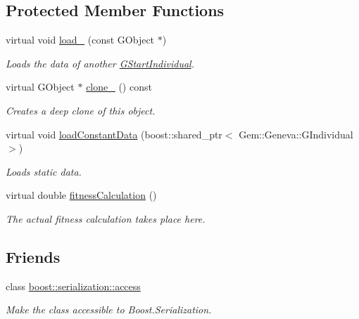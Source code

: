 \subsection*{Protected Member Functions}
\begin{DoxyCompactItemize}
\item 
virtual void \hyperlink{class_gem_1_1_geneva_1_1_g_start_individual_a012447d3b9772d94b8d4d35fb4fc2304}{load\-\_\-} (const G\-Object $\ast$)
\begin{DoxyCompactList}\small\item\em Loads the data of another \hyperlink{class_gem_1_1_geneva_1_1_g_start_individual}{G\-Start\-Individual}. \end{DoxyCompactList}\item 
virtual G\-Object $\ast$ \hyperlink{class_gem_1_1_geneva_1_1_g_start_individual_aa7d75cb7a4b93a2d766d99bdc11ebb73}{clone\-\_\-} () const 
\begin{DoxyCompactList}\small\item\em Creates a deep clone of this object. \end{DoxyCompactList}\item 
virtual void \hyperlink{class_gem_1_1_geneva_1_1_g_start_individual_a639b1102996bc7d57b872b69f53f5726}{load\-Constant\-Data} (boost\-::shared\-\_\-ptr$<$ Gem\-::\-Geneva\-::\-G\-Individual $>$)
\begin{DoxyCompactList}\small\item\em Loads static data. \end{DoxyCompactList}\item 
virtual double \hyperlink{class_gem_1_1_geneva_1_1_g_start_individual_a98d31a7196d550fc9ce0166f7041ca2b}{fitness\-Calculation} ()
\begin{DoxyCompactList}\small\item\em The actual fitness calculation takes place here. \end{DoxyCompactList}\end{DoxyCompactItemize}
\subsection*{Friends}
\begin{DoxyCompactItemize}
\item 
\hypertarget{class_gem_1_1_geneva_1_1_g_start_individual_ac98d07dd8f7b70e16ccb9a01abf56b9c}{class \hyperlink{class_gem_1_1_geneva_1_1_g_start_individual_ac98d07dd8f7b70e16ccb9a01abf56b9c}{boost\-::serialization\-::access}}\label{class_gem_1_1_geneva_1_1_g_start_individual_ac98d07dd8f7b70e16ccb9a01abf56b9c}

\begin{DoxyCompactList}\small\item\em Make the class accessible to Boost.\-Serialization. \end{DoxyCompactList}\end{DoxyCompactItemize}


